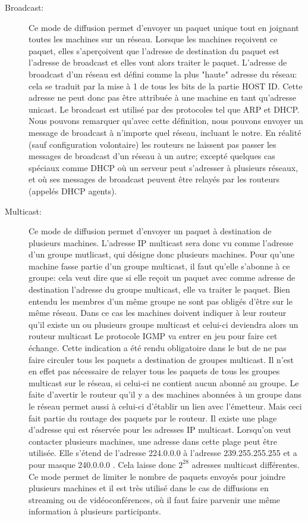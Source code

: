 \begin{description}
\item[Broadcast:] Ce mode de diffusion permet d'envoyer un paquet unique tout en 
joignant toutes les machines sur un réseau. Lorsque les machines reçoivent ce
paquet, elles s'aperçoivent que l'adresse de destination du paquet est l'adresse de
broadcast et elles vont alors traiter le paquet. L'adresse de broadcast d'un réseau
est défini comme la plus "haute" adresse du réseau: cela se traduit par la mise
à 1 de tous les bits de la partie HOST ID. Cette adresse ne peut donc pas être
attribuée à une machine en tant qu'adresse unicast.  Le broadcast est utilisé
par des protocoles tel que ARP et DHCP.  Nous pouvons remarquer qu'avec cette
définition, nous pouvons envoyer un message de broadcast à n'importe quel
réseau, incluant le notre. En réalité (sauf
configuration volontaire) les routeurs ne laissent pas passer les messages de
broadcast d'un réseau à un autre; excepté quelques cas spéciaux comme DHCP où un
serveur peut s'adresser à plusieurs réseaux, et où ses messages de broadcast
peuvent être relayés par les routeurs (appelés DHCP agents).

\item[Multicast:] Ce mode de diffusion permet d'envoyer un paquet à destination
de plusieurs machines. L'adresse IP multicast sera donc vu comme l'adresse d'un
groupe mutlicast, qui désigne donc plusieurs machines. Pour qu'une machine
fasse partie d'un groupe multicast, il faut qu'elle s'abonne à ce groupe: cela
veut dire que si elle reçoit un paquet avec comme adresse de destination
l'adresse du groupe multicast, elle va traiter le paquet.  Bien entendu les
membres d'un même groupe ne sont pas obligés d'être sur le même réseau. Dans ce
cas les machines doivent indiquer à leur routeur qu'il existe un ou plusieurs
groupe multicast et celui-ci deviendra alors un routeur multicast Le protocole
IGMP va entrer en jeu pour faire cet échange.  Cette indication a été rendu
obligatoire dans le but de ne pas faire circuler tous les paquets a destination
de groupes multicast.  Il n'est en effet pas nécessaire de relayer tous les
paquets de tous les groupes multicast sur le réseau, si celui-ci ne contient
aucun abonné au groupe.  Le faite d'avertir le routeur qu'il y a des machines
abonnées à un groupe dans le réseau permet aussi à celui-ci d'établir un lien
avec l'émetteur. Mais ceci fait partie du routage des paquets par le routeur.
Il existe une plage d'adresse qui est réservée pour les adresses IP multicast.
Lorsqu'on veut contacter plusieurs machines, une adresse dans cette plage peut
être utilisée.  Elle s'étend de l'adresse 224.0.0.0 à l'adresse 239.255.255.255
et a pour masque 240.0.0.0 . Cela laisse donc $2^{28}$ adresses multicast
différentes.
Ce mode permet de limiter le nombre de paquets envoyés pour joindre plusieurs
machines et il est très utilisé dans le cas de diffusions en streaming ou de
vidéoconférences, où il faut faire parvenir une même information à plusieurs
participants.


\end{description}
